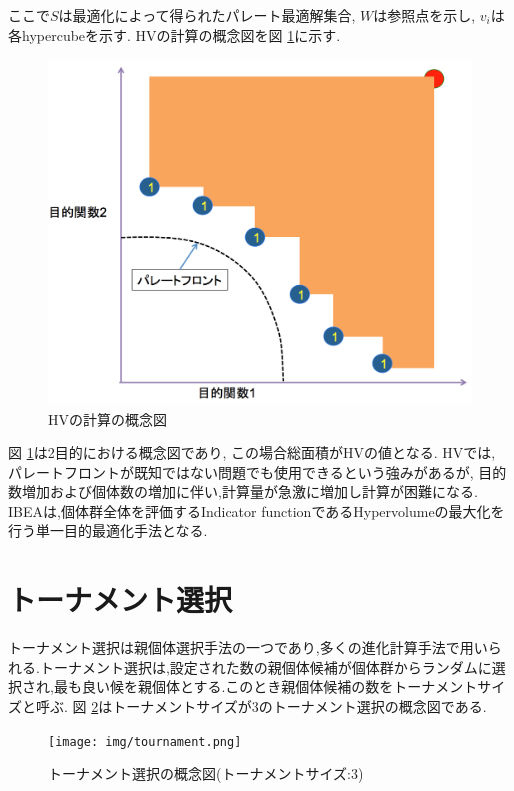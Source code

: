 \documentclass[12pt,a4j,notitlepage]{jreport}
\begin{document}
ここで$S$は最適化によって得られたパレート最適解集合, $W$は参照点を示し, $v_i$は各hypercubeを示す.
HVの計算の概念図を図 \ref{fig:hvimg}に示す.
\begin{figure}[htbp]
	\begin{center}
		\includegraphics[width=0.7\linewidth]{img/HVimg.png}
             		\setlength{\abovecaptionskip}{0mm}
		\setlength{\belowcaptionskip}{0mm}
			\caption{HVの計算の概念図}
	\label{fig:hvimg}
	\end{center}
\end{figure}

図 \ref{fig:hvimg}は2目的における概念図であり, この場合総面積がHVの値となる.
HVでは, パレートフロントが既知ではない問題でも使用できるという強みがあるが, 目的数増加および個体数の増加に伴い,計算量が急激に増加し計算が困難になる.
IBEAは,個体群全体を評価するIndicator functionであるHypervolumeの最大化を行う単一目的最適化手法となる.

\section{トーナメント選択}
トーナメント選択は親個体選択手法の一つであり,多くの進化計算手法で用いられる.トーナメント選択は,設定された数の親個体候補が個体群からランダムに選択され,最も良い候を親個体とする.このとき親個体候補の数をトーナメントサイズと呼ぶ\cite{katai}.
図 \ref{fig:tournament}はトーナメントサイズが3のトーナメント選択の概念図である.
\begin{figure}[htbp]
	\begin{center}
		\texttt{[image: img/tournament.png]}
             		\setlength{\abovecaptionskip}{0mm}
		\setlength{\belowcaptionskip}{0mm}
			\caption{トーナメント選択の概念図(トーナメントサイズ:3)}
	\label{fig:tournament}
	\end{center}
\end{figure}
\end{document}
